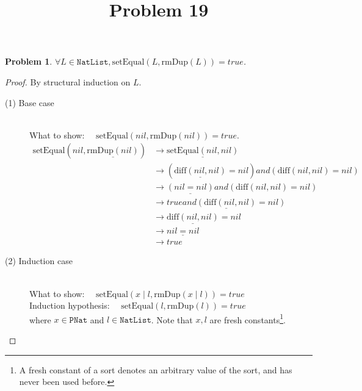 \documentclass[12pt, a4paper]{article}
\title{Problem 19}
\date{\vspace{-5ex}}
\newtheorem{problem}{Problem}
\newcommand{\rel}[1]{\mathrel{#1}}
\newcommand{\rmx}[1]{\mathrm{#1}}
\newcommand{\larrow}{\longrightarrow}
\newcommand{\under}{\underline}
\begin{document}
\maketitle

\begin{problem}
$\forall L \in \mathtt{NatList}, \rmx{setEqual}(L, \rmx{rmDup}(L)) = true$.
\end{problem}
\begin{proof}
By structural induction on $L$.
\begin{description}
\item[(1) Base case]~\\
\noindent
What to show: $\quad \rmx{setEqual}(nil, \rmx{rmDup}(nil)) = true$.
\begin{align*}
\rmx{setEqual}(nil, \under{\rmx{rmDup}(nil)})
	&\larrow \under{\rmx{setEqual}(nil, nil)} \tag{by rmDup1} \\
	&\larrow (\under{\rmx{diff}(nil, nil)} = nil) \rel{and} (\rmx{diff}(nil, nil) = nil) \tag{by setEq} \\
	&\larrow \under{(nil = nil)} \rel{and} (\rmx{diff}(nil, nil) = nil) \tag{by diff1} \\
	&\larrow \under{true \rel{and} (\rmx{diff}(nil, nil) = nil)} \tag{by equality} \\
	&\larrow \under{\rmx{diff}(nil, nil)} = nil \tag{by and} \\
	&\larrow \under{nil = nil} \tag{by diff1} \\
	&\larrow true \tag{by equality}
\end{align*}

\item[(2) Induction case]~\\
What to show: $\quad \rmx{setEqual}(x \mid l, \rmx{rmDup}(x \mid l)) = true$\\
Induction hypothesis: $\quad \rmx{setEqual}(l, \rmx{rmDup}(l)) = true$  \\
where $x \in \mathtt{PNat}$ and $l \in \mathtt{NatList}$.
Note that $x, l$ are fresh constants\footnote{A fresh constant of a sort denotes an arbitrary value of the sort, and has never been used before.}.


\end{description}
\end{proof}
\end{document}
